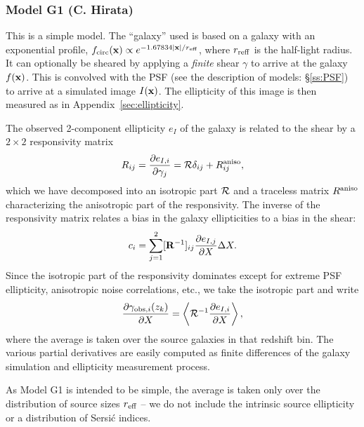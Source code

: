 
\subsubsection{Model G1 (C. Hirata)}

This is a simple model. The ``galaxy'' used is based on a galaxy with an exponential profile, $f_{\rm circ}({\bf x}) \propto e^{-1.67834|{\bf x}|/r_{\rm eff}}$, where $r_{\rm reff}$ is the half-light radius. It can optionally be sheared by applying a {\em finite} shear $\gamma$ to arrive at the galaxy $f({\bf x})$. This is convolved with the PSF (see the description of models: \S\ref{ss:PSF}) to arrive at a simulated image $I({\bf x})$. The ellipticity of this image is then measured as in Appendix~\ref{sec:ellipticity}.

The observed 2-component ellipticity $e_I$ of the galaxy is related to the shear by a $2\times 2$ responsivity matrix
\begin{equation}
R_{ij} = \frac{\partial e_{I,i}}{\partial\gamma_j} = {\cal R}\delta_{ij} + R^{\rm aniso}_{ij},
\end{equation}
which we have decomposed into an isotropic part ${\cal R}$ and a traceless matrix $R^{\rm aniso}$ characterizing the anisotropic part of the responsivity. The inverse of the responsivity matrix relates a bias in the galaxy ellipticities to a bias in the shear:
\begin{equation}
c_i = \sum_{j=1}^2 [{\bf R}^{-1}]_{ij} \frac{\partial e_{I,j}}{\partial X} \Delta X.
\end{equation}
Since the isotropic part of the responsivity dominates except for extreme PSF ellipticity, anisotropic noise correlations, etc., we take the isotropic part and write
\begin{equation}
\frac{\partial\gamma_{{\rm obs},i}(z_k)}{\partial X} = \left\langle {\cal R}^{-1} \frac{\partial e_{I,i}}{\partial X} \right\rangle,
\end{equation}
where the average is taken over the source galaxies in that redshift bin. The various partial derivatives are easily computed as finite differences of the galaxy simulation and ellipticity measurement process.

As Model G1 is intended to be simple, the average is taken only over the distribution of source sizes $r_{\rm eff}$ -- we do not include the intrinsic source ellipticity or a distribution of Sersi\'c indices. 
